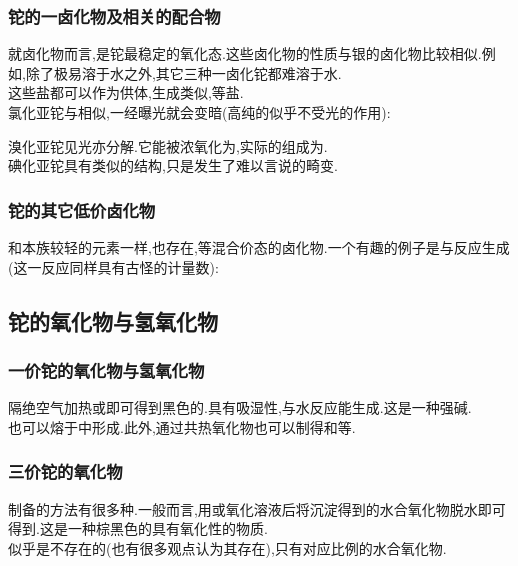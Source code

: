 \documentclass{ctexart}
\begin{document}
\subsubsection{铊的一卤化物及相关的配合物}
就卤化物而言,是铊最稳定的氧化态.这些卤化物的性质与银的卤化物比较相似.例如,除了极易溶于水之外,其它三种一卤化铊都难溶于水.\\
\indent 这些盐都可以作为供体,生成类似,等盐.\\
\indent 氯化亚铊与相似,一经曝光就会变暗(高纯的似乎不受光的作用):
\begin{center}
\end{center}
\indent 溴化亚铊见光亦分解.它能被浓氧化为,实际的组成为.\\
\indent 碘化亚铊具有类似的结构,只是发生了难以言说的畸变.
\subsubsection{铊的其它低价卤化物}
和本族较轻的元素一样,也存在,等混合价态的卤化物.一个有趣的例子是与反应生成(这一反应同样具有古怪的计量数):
\begin{center}
\end{center}
\subsection{铊的氧化物与氢氧化物}
\subsubsection{一价铊的氧化物与氢氧化物}
隔绝空气加热或即可得到黑色的.具有吸湿性,与水反应能生成.这是一种强碱.\\
\indent {}也可以熔于中形成.此外,通过共热氧化物也可以制得和等.
\subsubsection{三价铊的氧化物}
制备的方法有很多种.一般而言,用或氧化溶液后将沉淀得到的水合氧化物脱水即可得到.这是一种棕黑色的具有氧化性的物质.\\
\indent {}似乎是不存在的(也有很多观点认为其存在),只有对应比例的水合氧化物.
\end{document}
